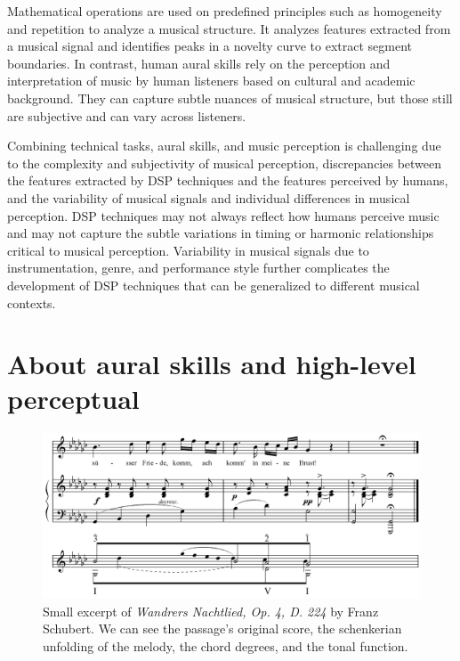 

Mathematical operations are used on predefined principles such as homogeneity and repetition to analyze a musical structure. It analyzes features extracted from a musical signal and identifies peaks in a novelty curve to extract segment boundaries. In contrast, human aural skills rely on the perception and interpretation of music by human listeners based on cultural and academic background. They can capture subtle nuances of musical structure, but those still are subjective and can vary across listeners.

Combining technical tasks, aural skills, and music perception is challenging due to the complexity and subjectivity of musical perception, discrepancies between the features extracted by DSP techniques and the features perceived by humans, and the variability of musical signals and individual differences in musical perception. DSP techniques may not always reflect how humans perceive music and may not capture the subtle variations in timing or harmonic relationships critical to musical perception. Variability in musical signals due to instrumentation, genre, and performance style further complicates the development of DSP techniques that can be generalized to different musical contexts.

\section{About aural skills and high-level perceptual}


\begin{figure}[h]
\includegraphics[clip,width=\columnwidth]{figures/schenkerian analysis/SchubertOp4no3.png}%
\caption{Small excerpt of \textit{Wandrers Nachtlied, Op. 4, D. 224} by Franz Schubert. We can see the passage's original score, the schenkerian unfolding of the melody, the chord degrees, and the tonal function.}
\label{fig:Wandrers Nachtlied, Op. 4, D. 224}
\end{figure}

